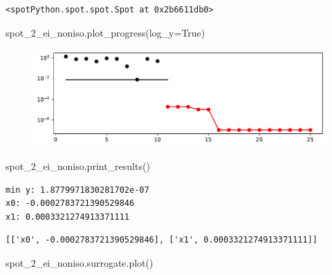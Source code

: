 \documentclass[
  letterpaper,
  DIV=11,
  numbers=noendperiod]{scrreprt}
\newenvironment{Shaded}{\begin{snugshade}}{\end{snugshade}}
\newcommand{\NormalTok}[1]{\textcolor[rgb]{0.00,0.23,0.31}{#1}}
\newcommand{\OperatorTok}[1]{\textcolor[rgb]{0.37,0.37,0.37}{#1}}
\newcommand{\VariableTok}[1]{\textcolor[rgb]{0.07,0.07,0.07}{#1}}
\begin{document}
\begin{verbatim}
<spotPython.spot.spot.Spot at 0x2b6611db0>
\end{verbatim}

\begin{Shaded}
\begin{Highlighting}[]
\NormalTok{spot\_2\_ei\_noniso.plot\_progress(log\_y}\OperatorTok{=}\VariableTok{True}\NormalTok{)}
\end{Highlighting}
\end{Shaded}

\begin{figure}[H]

{\centering \includegraphics{07_spot_ei_files/figure-pdf/cell-15-output-1.pdf}

}

\end{figure}

\begin{Shaded}
\begin{Highlighting}[]
\NormalTok{spot\_2\_ei\_noniso.print\_results()}
\end{Highlighting}
\end{Shaded}

\begin{verbatim}
min y: 1.8779971830281702e-07
x0: -0.0002783721390529846
x1: 0.0003321274913371111
\end{verbatim}

\begin{verbatim}
[['x0', -0.0002783721390529846], ['x1', 0.0003321274913371111]]
\end{verbatim}

\begin{Shaded}
\begin{Highlighting}[]
\NormalTok{spot\_2\_ei\_noniso.surrogate.plot()}
\end{Highlighting}
\end{Shaded}
\end{document}
